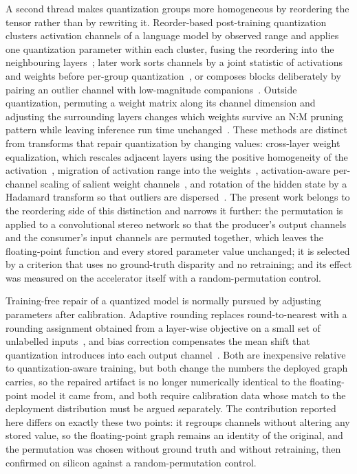 A second thread makes quantization groups more homogeneous by reordering the
tensor rather than by rewriting it. Reorder-based post-training quantization
clusters activation channels of a language model by observed range and applies
one quantization parameter within each cluster, fusing the reordering into the
neighbouring layers~\cite{rbq_yuan2023rptq}; later work sorts channels by a
joint statistic of activations and weights before per-group
quantization~\cite{rbq_cheng2026permuquant}, or composes blocks deliberately by
pairing an outlier channel with low-magnitude
companions~\cite{rbq_yao2026ocgquant}. Outside quantization, permuting a weight
matrix along its channel dimension and adjusting the surrounding layers changes
which weights survive an N:M pruning pattern while leaving inference run time
unchanged~\cite{rbq_pool2021permutations}. These methods are distinct from
transforms that repair quantization by changing values: cross-layer weight
equalization, which rescales adjacent layers using the positive homogeneity of
the activation~\cite{rbq_nagel2019dfq}, migration of activation range into the
weights~\cite{rbq_xiao2023smoothquant}, activation-aware per-channel scaling of
salient weight channels~\cite{rbq_lin2024awq}, and rotation of the hidden state
by a Hadamard transform so that outliers are
dispersed~\cite{rbq_ashkboos2024quarot}. The present work belongs to the
reordering side of this distinction and narrows it further: the permutation is
applied to a convolutional stereo network so that the producer's output
channels and the consumer's input channels are permuted together, which leaves
the floating-point function and every stored parameter value unchanged; it is
selected by a criterion that uses no ground-truth disparity and no retraining;
and its effect was measured on the accelerator itself with a
random-permutation control.

Training-free repair of a quantized model is normally pursued by adjusting
parameters after calibration. Adaptive rounding replaces round-to-nearest with
a rounding assignment obtained from a layer-wise objective on a small set of
unlabelled inputs~\cite{rbq_nagel2020adaround}, and bias correction compensates
the mean shift that quantization introduces into each output
channel~\cite{rbq_nagel2019dfq}. Both are inexpensive relative to
quantization-aware training, but both change the numbers the deployed graph
carries, so the repaired artifact is no longer numerically identical to the
floating-point model it came from, and both require calibration data whose
match to the deployment distribution must be argued separately. The
contribution reported here differs on exactly these two points: it regroups
channels without altering any stored value, so the floating-point graph remains
an identity of the original, and the permutation was chosen without ground
truth and without retraining, then confirmed on silicon against a
random-permutation control.

